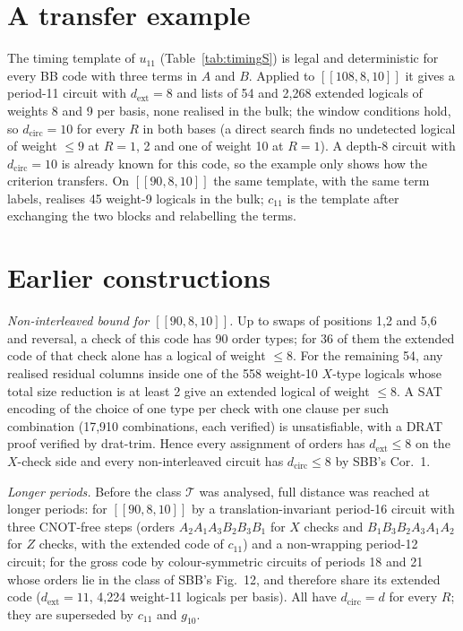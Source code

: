 \documentclass[aps,prl,twocolumn,superscriptaddress,nofootinbib]{revtex4-2}
\newif\ifshowclaimtags \showclaimtagsfalse
\newcommand{\cl}[1]{\ifshowclaimtags\textsuperscript{\textcolor{blue}{\scriptsize[#1]}}\fi}
\newcommand{\dcirc}{d_{\mathrm{circ}}}
\newcommand{\dext}{d_{\mathrm{ext}}}
\newcommand{\code}[1]{[[#1]]}
\newcommand{\T}{\mathcal{T}}
\begin{document}
\section{A transfer example}\label{sm:transfer}\cl{L-20}
The timing template of $u_{11}$ (Table~\ref{tab:timingS}) is legal and deterministic for every BB code with
three terms in $A$ and $B$. Applied to $\code{108,8,10}$ it gives a period-11 circuit with
$\dext=8$ and lists of 54 and 2,268 extended logicals of weights 8 and 9 per basis, none
realised in the bulk; the window conditions hold, so $\dcirc=10$ for every $R$ in both
bases (a direct search finds no undetected logical of weight $\le9$ at $R=1$, 2 and one of
weight 10 at $R=1$). A depth-8 circuit with $\dcirc=10$ is already known for this code, so the
example only shows how the criterion transfers. On $\code{90,8,10}$ the same template, with the
same term labels, realises 45 weight-9 logicals in the bulk; $c_{11}$ is the template after
exchanging the two blocks and relabelling the terms.

\section{Earlier constructions}\label{sm:earlier}\cl{L-22}
\emph{Non-interleaved bound for $\code{90,8,10}$.} Up to swaps of positions 1,2 and 5,6
and reversal, a check of this code has 90 order types; for 36 of them the extended code of
that check alone has a logical of weight $\le8$. For the remaining 54, any realised residual
columns inside one of the 558 weight-10 $X$-type logicals whose total size reduction is at
least 2 give an extended logical of weight $\le8$. A SAT encoding of the choice of one type
per check with one clause per such combination (17,910 combinations, each verified) is
unsatisfiable, with a DRAT proof verified by drat-trim. Hence every assignment of orders has
$\dext\le8$ on the $X$-check side and every non-interleaved circuit has $\dcirc\le8$ by SBB's
Cor.~1.

\emph{Longer periods.} Before the class $\T$ was analysed, full distance was reached at
longer periods: for $\code{90,8,10}$ by a translation-invariant period-16 circuit with three
CNOT-free steps (orders $A_2A_1A_3B_2B_3B_1$ for $X$ checks and $B_1B_3B_2A_3A_1A_2$ for $Z$
checks, with the extended code of $c_{11}$) and a non-wrapping period-12 circuit; for the gross
code by colour-symmetric circuits of periods 18 and 21 whose orders lie in the class of SBB's
Fig.~12, and therefore share its extended code ($\dext=11$, 4,224 weight-11 logicals per
basis). All have $\dcirc=d$ for every $R$; they are superseded by $c_{11}$ and $g_{10}$.
\end{document}
